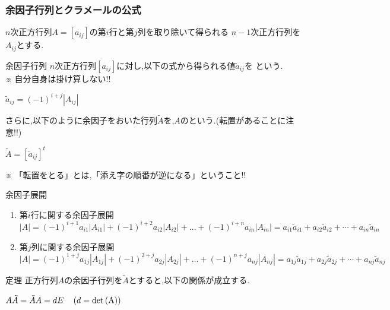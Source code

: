 \documentclass[a4paper]{jsarticle}
\begin{document}
\subsubsection{余因子行列とクラメールの公式}
$n$次正方行列$A=\left[a_{ij}\right]$の第$i$行と第$j$列を取り除いて得られる
$n-1$次正方行列を$A_{ij}$とする.
\begin{itembox}[l]{余因子行列}
    $n$次正方行列$\left[a_{ij}\right]$に対し,以下の式から得られる値$\tilde{a}_{ij}$を
    という.\\
    ※ 自分自身は掛け算しない!!
    \begin{center}
        $\tilde{a}_{ij}=\left(-1\right)^{i+j}\left|A_{ij}\right|$
    \end{center}
    さらに,以下のように余因子をおいた行列$\tilde{A}$を,$A$のという.(転置があることに注意!!)
    \begin{center}
        $\tilde{A}=\left[\tilde{a}_{ij}\right]^t$
    \end{center}
    ※ 「転置をとる」とは,「添え字の順番が逆になる」ということ!!
\end{itembox}
\begin{itembox}[l]{余因子展開}
    \begin{enumerate}[(1)]
        \item 第$i$行に関する余因子展開\\
              $\left|A\right|=(-1)^{i+1}a_{i1}\left|A_{i1}\right|+(-1)^{i+2}a_{i2}\left|A_{i2}\right|+ \dots +(-1)^{i+n}a_{in}\left|A_{in}\right|
                  =a_{i1}\tilde{a}_{i1}+a_{i2}\tilde{a}_{i2}+\cdots +a_{in}\tilde{a}_{in}$
        \item 第$j$列に関する余因子展開\\
              $\left|A\right|=(-1)^{1+j}a_{1j}\left|A_{1j}\right|+(-1)^{2+j}a_{2j}\left|A_{2j}\right|+ \dots +(-1)^{n+j}a_{nj}\left|A_{nj}\right|
                  =a_{1j}\tilde{a}_{1j}+a_{2j}\tilde{a}_{2j}+\cdots +a_{nj}\tilde{a}_{nj}$
    \end{enumerate}
\end{itembox}
\begin{itembox}[l]{定理}
    正方行列$A$の余因子行列を$\tilde{A}$とすると,以下の関係が成立する.
    \begin{center}
        $A\tilde{A}=\tilde{A}A=dE\quad\left(d=\rm{det}\left(A\right)\right)$
    \end{center}
\end{itembox}
\end{document}
